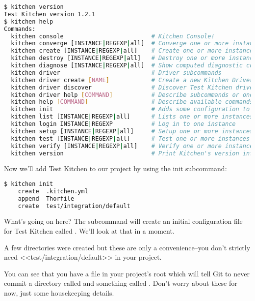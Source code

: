 \begin{lstlisting}[language=Bash,label=lst:testing-test-kitchen2]
$ kitchen version
Test Kitchen version 1.2.1
$ kitchen help
Commands:
  kitchen console                         # Kitchen Console!
  kitchen converge [INSTANCE|REGEXP|all]  # Converge one or more instances
  kitchen create [INSTANCE|REGEXP|all]    # Create one or more instances
  kitchen destroy [INSTANCE|REGEXP|all]   # Destroy one or more instances
  kitchen diagnose [INSTANCE|REGEXP|all]  # Show computed diagnostic configuration
  kitchen driver                          # Driver subcommands
  kitchen driver create [NAME]            # Create a new Kitchen Driver gem project
  kitchen driver discover                 # Discover Test Kitchen drivers published on RubyGems
  kitchen driver help [COMMAND]           # Describe subcommands or one specific subcommand
  kitchen help [COMMAND]                  # Describe available commands or one specific command
  kitchen init                            # Adds some configuration to your cookbook so Kitchen can rock
  kitchen list [INSTANCE|REGEXP|all]      # Lists one or more instances
  kitchen login INSTANCE|REGEXP           # Log in to one instance
  kitchen setup [INSTANCE|REGEXP|all]     # Setup one or more instances
  kitchen test [INSTANCE|REGEXP|all]      # Test one or more instances
  kitchen verify [INSTANCE|REGEXP|all]    # Verify one or more instances
  kitchen version                         # Print Kitchen's version information
\end{lstlisting}

Now we'll add Test Kitchen to our project by using the init subcommand:

\begin{lstlisting}[language=Bash,label=lst:testing-test-kitchen3]
$ kitchen init
    create  .kitchen.yml
    append  Thorfile
    create  test/integration/default
\end{lstlisting}

What's going on here? The  subcommand will create an initial configuration file for Test Kitchen called . We'll look at that in a moment.

A few directories were created but these are only a convenience–you don't strictly need <<test/integration/default>> in your project.

You can see that you have a  file in your project's root which will tell Git to never commit a directory called  and something called . Don't worry about these for now, just some housekeeping details.

